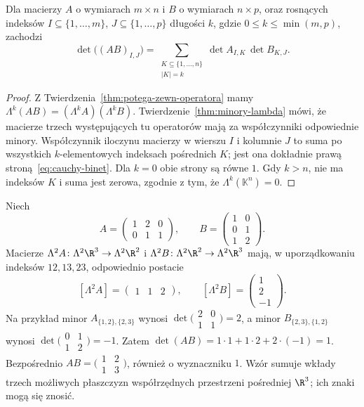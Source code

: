 \begin{wniosek}
\label{cor:cauchy-binet}
Dla macierzy $A$ o wymiarach $m\times n$ i $B$ o wymiarach
$n\times p$, oraz rosnących indeksów $I\subseteq\{1,\ldots,m\}$,
$J\subseteq\{1,\ldots,p\}$ długości $k$, gdzie $0\leq k\leq\min(m,p)$,
zachodzi
\begin{equation}\label{eq:cauchy-binet}
 \det\bigl((AB)_{I,J}\bigr)
 =\sum_{\substack{K\subseteq\{1,\ldots,n\}\\ |K|=k}}
 \det A_{I,K}\,\det B_{K,J}.
\end{equation}
\end{wniosek}
\begin{proof}
Z Twierdzenia~\ref{thm:potega-zewn-operatora} mamy
$\Lambda^k(AB)=(\Lambda^k A)(\Lambda^k B)$.
Twierdzenie~\ref{thm:minory-lambda} mówi, że macierze
trzech występujących tu operatorów mają za współczynniki
odpowiednie minory. Współczynnik iloczynu macierzy w
wierszu $I$ i kolumnie $J$ to suma po wszystkich
$k$-elementowych indeksach pośrednich $K$; jest ona
dokładnie prawą stroną~\eqref{eq:cauchy-binet}.
Dla $k=0$ obie strony są równe $1$. Gdy $k>n$,
nie ma indeksów $K$ i suma jest zerowa, zgodnie z tym,
że $\Lambda^k(\mathbb K^n)=0$.
\end{proof}

\begin{przyklad}
Niech
\[
 A=\begin{pmatrix}1&2&0\\0&1&1\end{pmatrix},\qquad
 B=\begin{pmatrix}1&0\\0&1\\1&2\end{pmatrix}.
\]
Macierze $\Lambda^2A\colon\Lambda^2\R^3\to\Lambda^2\R^2$
i $\Lambda^2B\colon\Lambda^2\R^2\to\Lambda^2\R^3$ mają,
w uporządkowaniu indeksów $12,13,23$, odpowiednio postacie
\[
 [\Lambda^2A]=\begin{pmatrix}1&1&2\end{pmatrix},\qquad
 [\Lambda^2B]=\begin{pmatrix}1\\2\\-1\end{pmatrix}.
\]
Na przykład minor $A_{\{1,2\},\{2,3\}}$ wynosi
$\det\bigl(\begin{smallmatrix}2&0\\1&1\end{smallmatrix}\bigr)=2$,
a minor $B_{\{2,3\},\{1,2\}}$ wynosi
$\det\bigl(\begin{smallmatrix}0&1\\1&2\end{smallmatrix}\bigr)=-1$.
Zatem $\det(AB)=1\cdot1+1\cdot2+2\cdot(-1)=1$.
Bezpośrednio $AB=\bigl(\begin{smallmatrix}1&2\\1&3\end{smallmatrix}\bigr)$,
również o wyznaczniku $1$. Wzór sumuje wkłady trzech
możliwych płaszczyzn współrzędnych przestrzeni pośredniej $\R^3$;
ich znaki mogą się znosić.
\end{przyklad}

